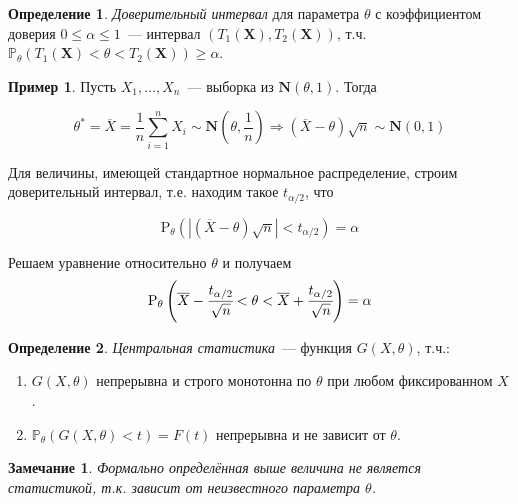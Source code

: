 \documentclass[oneside,final,14pt]{extreport}
\newtheorem*{rmrk}{Замечание}
\theoremstyle{definition}
\newtheorem{defn}{Определение}[section]
\newtheorem*{exmp}{Пример}
\begin{document}
\begin{defn}
{\it Доверительный интервал} для параметра $\theta$ с коэффициентом доверия $0 \leqslant \alpha \leqslant 1$~--- интервал $(T_1(\mathbf{X}), T_2(\mathbf{X}))$, т.ч. $\mathbb{P}_{\theta}(T_1(\mathbf{X}) < \theta < T_2(\mathbf{X})) \geq \alpha$.
\end{defn}

\begin{exmp}
Пусть $X_1, \ldots, X_n$~--- выборка из $\mathbf{N}(\theta, 1)$. Тогда

\begin{equation*}
    \theta^{*}
    = \overline{X}
    = \frac{1}{n} \sum_{i=1}^{n} X_{i} \sim \mathbf{N}\left(\theta, \frac{1}{n}\right)
    \Rightarrow (\overline{X}-\theta) \sqrt{n} \sim \mathbf{N}(0,1)
\end{equation*}

Для величины, имеющей стандартное нормальное распределение, строим доверительный интервал, т.е. находим такое $t_{\alpha / 2}$, что 

\begin{equation*}
    \mathrm{P}_{\theta}\left(|(\overline{X}-\theta) \sqrt{n}|<t_{\alpha / 2}\right)=\alpha
\end{equation*}

Решаем уравнение относительно $\theta$ и получаем
\begin{equation*}
    \mathrm{P}_{\theta}\left(\overline{X}-\cfrac{t_{\alpha / 2}}{\sqrt{n}}<\theta<\overline{X}+\cfrac{t_{\alpha / 2}}{\sqrt{n}}\right)=\alpha 
\end{equation*}

\end{exmp}

\begin{defn}
{\it Центральная статистика}~--- функция $G(X,\theta)$, т.ч.:
\begin{enumerate}
    \item $G(X,\theta)$ непрерывна и строго монотонна по $\theta$ при любом фиксированном $X$.
    \item $\mathbb{P}_{\theta}(G(X, \theta)<t)=F(t)$ непрерывна и не зависит от $\theta$.
\end{enumerate}
\end{defn}

\begin{rmrk}
Формально определённая выше величина не является статистикой, т.к. зависит от неизвестного параметра $\theta$.
\end{rmrk}
\end{document}
